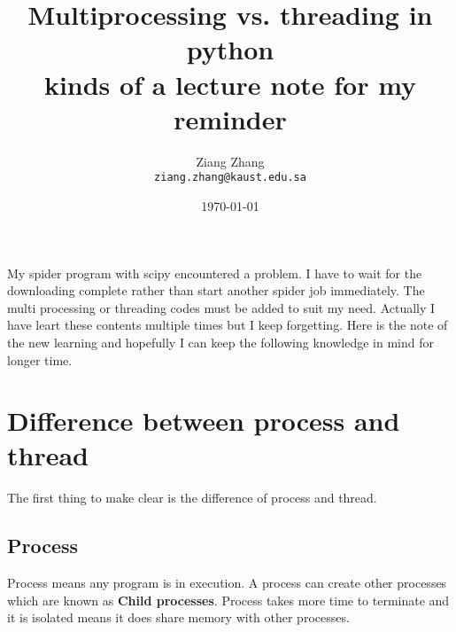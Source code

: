 \documentclass[a4paper, 11pt]{article}
\title{Multiprocessing vs. threading in python\\
kinds of a lecture note for my reminder}
\author{Ziang Zhang \\ \texttt{ziang.zhang@kaust.edu.sa}}
\date{\today}
\numberwithin{equation}{subsection}
\begin{document}
\maketitle
\tableofcontents

My spider program with scipy encountered a problem. I have to wait for the downloading complete rather than start another spider job immediately. The multi processing or threading codes must be added to suit my need. Actually I have leart these contents multiple times but I keep forgetting. Here is the note of the new learning and hopefully I can keep the following knowledge in mind for longer time.

\section{Difference between process and thread}

    The first thing to make clear is the difference of process and thread. 

    \subsection{Process}

    Process means any program is in execution. A process can create other processes which are known as \textbf{Child processes}. Process takes more time to terminate and it is isolated means it does share memory with other processes. 
\newpage
%
\end{document}
